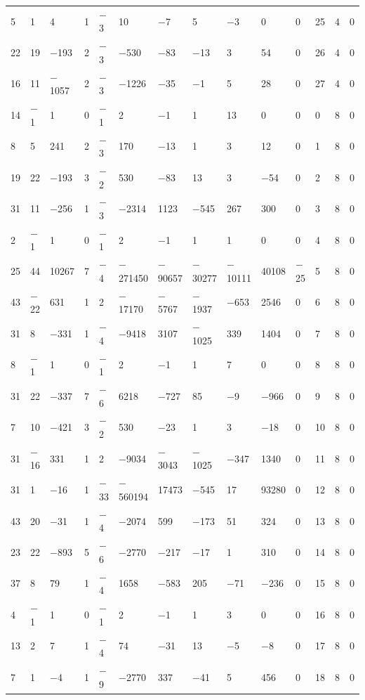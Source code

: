 \documentclass[pdftex]{sigma}
\numberwithin{equation}{section}
\theoremstyle{definition}
\numberwithin{table}{section}
\begin{document}
{\begin{paracol}{3}
\begin{supertabular}{|w{c}{.32cm}w{c}{.32cm}w{c}{.32cm}@{\hspace{.5cm}}w{c}{.2cm}w{c}{.2cm}|@{\hspace{\tabcolsep}}HHHHHHw{c}{.17cm}w{c}{.17cm}w{c}{.17cm}|}
			5 & 1 & 4 & 1 & $-$3 & 10 & $-$7 & 5 & $-$3 & 0 & 0 & 25 & 4 & 0 \\
			22 & 19 & $-$193 & 2 & $-$3 & $-$530 & $-$83 & $-$13 & 3 & 54 & 0 & 26 & 4 & 0 \\
			16 & 11 & $-$1057 & 2 & $-$3 & $-$1226 & $-$35 & $-$1 & 5 & 28 & 0 & 27 & 4 & 0 \\
			14 & $-$1 & 1 & 0 & $-$1 & 2 & $-$1 & 1 & 13 & 0 & 0 & 0 & 8 & 0 \\
			8 & 5 & 241 & 2 & $-$3 & 170 & $-$13 & 1 & 3 & 12 & 0 & 1 & 8 & 0 \\
			19 & 22 & $-$193 & 3 & $-$2 & 530 & $-$83 & 13 & 3 & $-$54 & 0 & 2 & 8 & 0 \\
			31 & 11 & $-$256 & 1 & $-$3 & $-$2314 & 1123 & $-$545 & 267 & 300 & 0 & 3 & 8 & 0 \\
			2 & $-$1 & 1 & 0 & $-$1 & 2 & $-$1 & 1 & 1 & 0 & 0 & 4 & 8 & 0 \\
			25 & 44 & 10267 & 7 & $-$4 & $-$271450 & $-$90657 & $-$30277 & $-$10111 & 40108 & $-$25 & 5 & 8 & 0 \\
			43 & $-$22 & 631 & 1 & 2 & $-$17170 & $-$5767 & $-$1937 & $-$653 & 2546 & 0 & 6 & 8 & 0 \\
			31 & 8 & $-$331 & 1 & $-$4 & $-$9418 & 3107 & $-$1025 & 339 & 1404 & 0 & 7 & 8 & 0 \\
			8 & $-$1 & 1 & 0 & $-$1 & 2 & $-$1 & 1 & 7 & 0 & 0 & 8 & 8 & 0 \\
			31 & 22 & $-$337 & 7 & $-$6 & 6218 & $-$727 & 85 & $-$9 & $-$966 & 0 & 9 & 8 & 0 \\
			7 & 10 & $-$421 & 3 & $-$2 & 530 & $-$23 & 1 & 3 & $-$18 & 0 & 10 & 8 & 0 \\
			31 & $-$16 & 331 & 1 & 2 & $-$9034 & $-$3043 & $-$1025 & $-$347 & 1340 & 0 & 11 & 8 & 0 \\
			31 & 1 & $-$16 & 1 & $-$33 & $-$560194 & 17473 & $-$545 & 17 & 93280 & 0 & 12 & 8 & 0 \\
			43 & 20 & $-$31 & 1 & $-$4 & $-$2074 & 599 & $-$173 & 51 & 324 & 0 & 13 & 8 & 0 \\
			23 & 22 & $-$893 & 5 & $-$6 & $-$2770 & $-$217 & $-$17 & 1 & 310 & 0 & 14 & 8 & 0 \\
			37 & 8 & 79 & 1 & $-$4 & 1658 & $-$583 & 205 & $-$71 & $-$236 & 0 & 15 & 8 & 0 \\
			4 & $-$1 & 1 & 0 & $-$1 & 2 & $-$1 & 1 & 3 & 0 & 0 & 16 & 8 & 0 \\
			13 & 2 & 7 & 1 & $-$4 & 74 & $-$31 & 13 & $-$5 & $-$8 & 0 & 17 & 8 & 0 \\
			7 & 1 & $-$4 & 1 & $-$9 & $-$2770 & 337 & $-$41 & 5 & 456 & 0 & 18 & 8 & 0 \\

\end{supertabular}
\end{paracol}}
\end{document}
